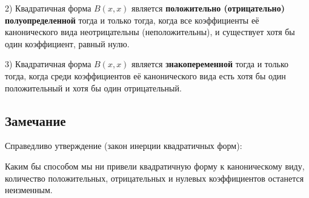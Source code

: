 {2) Квадратичная форма \( B(x, x) \) является \textbf{положительно (отрицательно) полуопределенной} тогда и только тогда, когда все коэффициенты её канонического вида неотрицательны (неположительны), и существует хотя бы один коэффициент, равный нулю.

3) Квадратичная форма \( B(x, x) \) является \textbf{знакопеременной} тогда и только тогда, когда среди коэффициентов её канонического вида есть хотя бы один положительный и хотя бы один отрицательный.

\subsection*{Замечание}

Справедливо утверждение (закон инерции квадратичных форм):

Каким бы способом мы ни привели квадратичную форму к каноническому виду, количество положительных, отрицательных и нулевых коэффициентов останется неизменным.

}